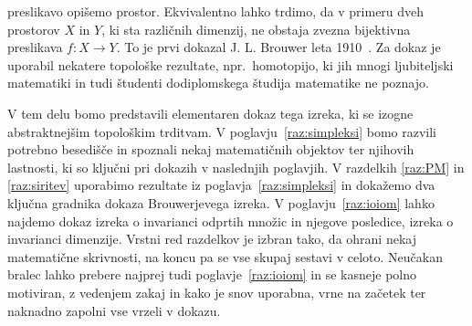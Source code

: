 \documentclass[mat1]{fmfdelo}
\newcommand{\0}{0}
\begin{document}
preslikavo opišemo prostor. Ekvivalentno lahko trdimo, da v primeru dveh prostorov $X$ in $Y$, ki sta različnih dimenzij, ne obstaja zvezna bijektivna preslikava $f : X \to Y$. To je prvi dokazal J. L. Brouwer leta 1910~\cite[str.\ 208]{Gouvea2011}. Za dokaz je uporabil nekatere topološke rezultate, npr.\ homotopijo, ki jih mnogi ljubiteljski matematiki in tudi študenti dodiplomskega študija matematike ne poznajo. 

V tem delu bomo predstavili elementaren dokaz tega izreka, ki se izogne abstraktnejšim topološkim trditvam. V poglavju~\ref{raz:simpleksi} bomo razvili potrebno besedišče in spoznali nekaj matematičnih objektov ter njihovih lastnosti, ki so ključni pri dokazih v naslednjih poglavjih. V razdelkih \ref{raz:PM} in \ref{raz:siritev} uporabimo rezultate iz poglavja~\ref{raz:simpleksi} in dokažemo dva ključna gradnika dokaza Brouwerjevega izreka. V poglavju~\ref{raz:ioiom} lahko najdemo dokaz izreka o invarianci odprtih množic in njegove posledice, izreka o invarianci dimenzije. Vrstni red razdelkov je izbran tako, da ohrani nekaj matematične skrivnosti, na koncu pa se vse skupaj sestavi v celoto. Neučakan bralec lahko prebere najprej tudi poglavje~\ref{raz:ioiom} in se kasneje polno motiviran, z vedenjem zakaj in kako je snov uporabna, vrne na začetek ter naknadno zapolni vse vrzeli v dokazu.


\end{document}
